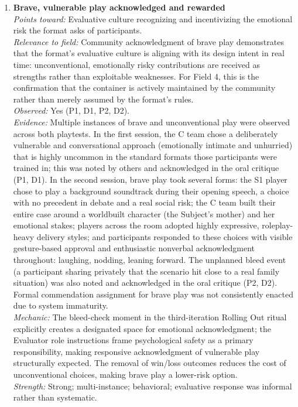 \documentclass[12pt]{article}
\begin{document}
\begin{enumerate}
\item \textbf{Brave, vulnerable play acknowledged and rewarded}\\
\textit{Points toward:} Evaluative culture recognizing and incentivizing the emotional risk the format asks of participants.\\
\textit{Relevance to field:} Community acknowledgment of brave play demonstrates that the format's evaluative culture is aligning with its design intent in real time: unconventional, emotionally risky contributions are received as strengths rather than exploitable weaknesses. For Field 4, this is the confirmation that the container is actively maintained by the community rather than merely assumed by the format's rules.\\
\textit{Observed:} Yes (P1, D1, P2, D2).\\
\textit{Evidence:} Multiple instances of brave and unconventional play were observed across both playtests. In the first session, the C team chose a deliberately vulnerable and conversational approach (emotionally intimate and unhurried) that is highly uncommon in the standard formats those participants were trained in; this was noted by others and acknowledged in the oral critique (P1, D1). In the second session, brave play took several forms: the S1 player chose to play a background soundtrack during their opening speech, a choice with no precedent in debate and a real social risk; the C team built their entire case around a worldbuilt character (the Subject's mother) and her emotional stakes; players across the room adopted highly expressive, roleplay-heavy delivery styles; and participants responded to these choices with visible gesture-based approval and enthusiastic nonverbal acknowledgment throughout: laughing, nodding, leaning forward. The unplanned bleed event (a participant sharing privately that the scenario hit close to a real family situation) was also noted and acknowledged in the oral critique (P2, D2). Formal commendation assignment for brave play was not consistently enacted due to system immaturity.\\
\textit{Mechanic:} The bleed-check moment in the third-iteration Rolling Out ritual explicitly creates a designated space for emotional acknowledgment; the Evaluator role instructions frame psychological safety as a primary responsibility, making responsive acknowledgment of vulnerable play structurally expected. The removal of win/loss outcomes reduces the cost of unconventional choices, making brave play a lower-risk option.\\
\textit{Strength:} Strong; multi-instance; behavioral; evaluative response was informal rather than systematic.


\end{enumerate}
\end{document}
